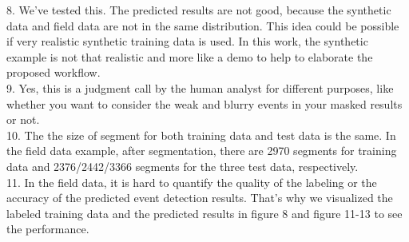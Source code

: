 \begin{enumerate}
{8. We've tested this. The predicted results are not good, because the synthetic data and field data are not in the same distribution. This idea could be possible if very realistic synthetic training data is used. In this work, the synthetic example is not that realistic and more like a demo to help to elaborate the proposed workflow. \\
9. Yes, this is a judgment call by the human analyst for different purposes, like whether you want to consider the weak and blurry events in your masked results or not.  \\
10. The the size of segment for both training data and test data is the same. In the field data example, after segmentation, there are 2970 segments for training data and 2376/2442/3366 segments for the three test data, respectively. \\
11. In the field data, it is hard to quantify the quality of the labeling or the accuracy of the predicted event detection results. That's why we visualized the labeled training data and the predicted results in figure 8 and figure 11-13 to see the performance.}\\

\end{enumerate}


